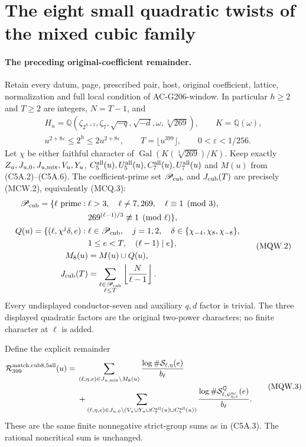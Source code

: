 \section{The eight small quadratic twists of the mixed cubic family}
\label{sec:mixed-cubic-quadratic-window}

\paragraph{The preceding original-coefficient remainder.}
Retain every datum, page, prescribed pair, host, original coefficient,
lattice, normalization and full local condition of AC-G206-window.
In particular $h\geq2$ and $T\geq2$ are integers, $N=T-1$, and
\[
 \begin{gathered}
 H_u=\mathbb Q(\zeta_{2^{h+2}},\zeta_7,\sqrt{-q},\sqrt{-d},
                  \omega,\sqrt[3]{269}),\qquad K=\mathbb Q(\omega),\\
 u^{2+8\varepsilon}\leq2^h\leq2u^{2+8\varepsilon},\qquad
 T=\lfloor u^{399}\rfloor,\qquad0<\varepsilon<1/256.
 \end{gathered}\tag{MQW.1}
\]
Let $\chi$ be either faithful character of
$\operatorname{Gal}(K(\sqrt[3]{269})/K)$.
Keep exactly $Z_u,J_{u,0},J_{u,\rm mix},V_u,Y_u$,
$C_5^{\rm all}(u),U_5^{\rm all}(u),C_7^{\rm all}(u),U_7^{\rm all}(u)$
and $M(u)$ from (C5A.2)--(C5A.6).
The coefficient-prime set $\mathscr P_{\rm cub}$ and
$J_{\rm cub}(T)$ are precisely (MCW.2), equivalently (MCQ.3):
\[
 \begin{split}
 \mathscr P_{\rm cub}=\{\ell\text{ prime}:{}&\ell>3,\quad
    \ell\ne7,269,\quad\ell\equiv1\pmod3,\\
    &269^{(\ell-1)/3}\not\equiv1\pmod\ell\},\\
 Q(u)=\{(\ell,\chi^j\delta,e):{}&\ell\in\mathscr P_{\rm cub},\quad
       j=1,2,\quad\delta\in\{\chi_{-4},\chi_8,\chi_{-8}\},\\
       &1\leq e<T,\quad(\ell-1)\mid e\},\\
 M_8(u)&=M(u)\cup Q(u),\\
 J_{\rm cub}(T)&=\sum_{\substack{\ell\in\mathscr P_{\rm cub}\\\ell\leq T}}
                         \left\lfloor\frac{N}{\ell-1}\right\rfloor.
 \end{split}\tag{MQW.2}
\]
Every undisplayed conductor-seven and auxiliary $q,d$ factor
is trivial. The three displayed quadratic factors are the original
two-power characters; no finite character at $\ell$ is added.

Define the explicit remainder
\[
 \begin{split}
 \mathcal R_{399}^{\rm match,cub8,5all}(u)={}&
  \sum_{(\ell,\eta,e)\in J_{u,\rm mix}\setminus M_8(u)}
                    \frac{\log\#\mathcal S_{\ell,\eta}(e)}{b_\ell}\\
 &+\sum_{(\ell,\eta,e)\in
       J_{u,0}\setminus(V_u\cup Y_u\cup C_7^{\rm all}(u)
                                       \cup C_5^{\rm all}(u))}
       \frac{\log\#\mathcal S^{\mathbb Q}_{\ell,
                            \psi_{\eta,e}^{\rm nc}}(e)}{b_\ell}.
 \end{split}\tag{MQW.3}
\]
These are the same finite nonnegative strict-group sums as in
(C5A.3). The rational noncritical sum is unchanged.

